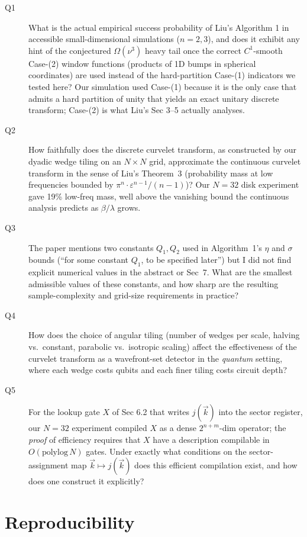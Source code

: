 \documentclass[11pt]{article}
\begin{document}
\begin{description}
\item[Q1] What is the actual empirical success probability of Liu's Algorithm 1 in accessible small-dimensional simulations ($n=2, 3$), and does it exhibit any hint of the conjectured $\Omega(\nu^3)$ heavy tail once the correct $C^1$-smooth Case-(2) window functions (products of 1D bumps in spherical coordinates) are used instead of the hard-partition Case-(1) indicators we tested here? Our simulation used Case-(1) because it is the only case that admits a hard partition of unity that yields an exact unitary discrete transform; Case-(2) is what Liu's Sec 3--5 actually analyses.
\item[Q2] How faithfully does the discrete curvelet transform, as constructed by our dyadic wedge tiling on an $N \times N$ grid, approximate the continuous curvelet transform in the sense of Liu's Theorem~3 (probability mass at low frequencies bounded by $\pi^n \cdot \varepsilon^{n-1} / (n-1)$)? Our $N=32$ disk experiment gave 19\% low-freq mass, well above the vanishing bound the continuous analysis predicts as $\beta / \lambda$ grows.
\item[Q3] The paper mentions two constants $Q_1, Q_2$ used in Algorithm~1's $\eta$ and $\sigma$ bounds (``for some constant $Q_1$, to be specified later'') but I did not find explicit numerical values in the abstract or Sec~7. What are the smallest admissible values of these constants, and how sharp are the resulting sample-complexity and grid-size requirements in practice?
\item[Q4] How does the choice of angular tiling (number of wedges per scale, halving vs.\ constant, parabolic vs.\ isotropic scaling) affect the effectiveness of the curvelet transform as a wavefront-set detector in the \emph{quantum} setting, where each wedge costs qubits and each finer tiling costs circuit depth?
\item[Q5] For the lookup gate $X$ of Sec 6.2 that writes $j(\vec k)$ into the sector register, our $N=32$ experiment compiled $X$ as a dense $2^{n+m}$-dim operator; the \emph{proof} of efficiency requires that $X$ have a description compilable in $O(\text{polylog}\,N)$ gates. Under exactly what conditions on the sector-assignment map $\vec k \mapsto j(\vec k)$ does this efficient compilation exist, and how does one construct it explicitly?
\end{description}

\section*{Reproducibility}
\end{document}
